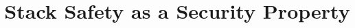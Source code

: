 \documentclass[acmsmall,review,anonymous]{acmart}\settopmatter{printfolios=true,printccs=false,printacmref=false}
\begin{document}
\title{Stack Safety as a Security Property}         %



% 
\end{document}
